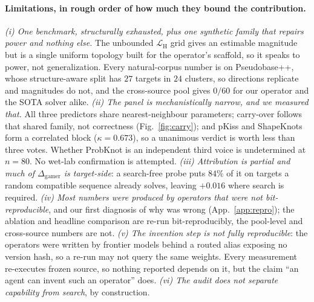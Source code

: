 \documentclass[11pt]{article}
\begin{document}
\paragraph{Limitations, in rough order of how much they bound the contribution.} \emph{(i) One benchmark,
structurally exhausted, plus one synthetic family that repairs power and nothing else.} The unbounded
$\mathcal L_{\mathrm H}$ grid gives an estimable magnitude but is a single uniform topology built for the
operator's scaffold, so it speaks to power, not generalization. Every natural-corpus number is on
Pseudobase++, whose structure-aware split has $27$ targets in $24$ clusters, so directions replicate and
magnitudes do not, and the cross-source pool gives $0/60$ for our operator and the SOTA solver alike.
\emph{(ii) The panel is mechanistically narrow, and we measured that.} All three predictors share
nearest-neighbour parameters; carry-over follows that shared family, not correctness (Fig.~\ref{fig:carry});
and pKiss and ShapeKnots form a correlated block ($\kappa=0.673$), so a unanimous verdict is worth less than
three votes. Whether ProbKnot is an independent third voice is undetermined at $n{=}80$. No wet-lab
confirmation is attempted. \emph{(iii) Attribution is partial and much of $\Delta_{\mathrm{gamer}}$ is
target-side}: a search-free probe puts $84\%$ of it on targets a random compatible sequence already solves,
leaving ${+}0.016$ where search is required. \emph{(iv) Most numbers were produced by operators that were not
bit-reproducible}, and our first diagnosis of why was wrong (App.~\ref{app:repro}); the ablation and headline
comparison are re-run bit-reproducibly, the pool-level and cross-source numbers are not. \emph{(v) The
invention step is not fully reproducible}: the operators were written by frontier models behind a routed alias
exposing no version hash, so a re-run may not query the same weights. Every measurement re-executes frozen
source, so nothing reported depends on it, but the claim ``an agent can invent such an operator'' does.
\emph{(vi) The audit does not separate capability from search}, by construction.
\end{document}
